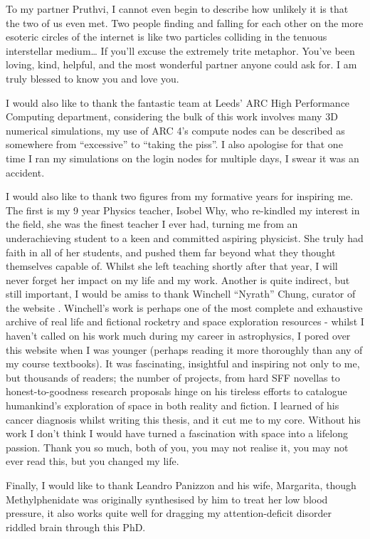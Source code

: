 \begin{acknowledgements}
To my partner Pruthvi, I cannot even begin to describe how unlikely it is that the two of us even met.
Two people finding and falling for each other on the more esoteric circles of the internet is like two particles colliding in the tenuous interstellar medium\ldots{}
If you'll excuse the extremely trite metaphor.
You've been loving, kind, helpful, and the most wonderful partner anyone could ask for.
I am truly blessed to know you and love you.

I would also like to thank the fantastic team at Leeds' ARC High Performance Computing department, considering the bulk of this work involves many 3D numerical simulations, my use of ARC 4's compute nodes can be described as somewhere from ``excessive'' to ``taking the piss''.
I also apologise for that one time I ran my simulations on the login nodes for multiple days, I swear it was an accident.

I would also like to thank two figures from my formative years for inspiring me.
The first is my 9 year Physics teacher, Isobel Why, who re-kindled my interest in the field, she was the finest teacher I ever had, turning me from an underachieving student to a keen and committed aspiring physicist.
She truly had faith in all of her students, and pushed them far beyond what they thought themselves capable of.
Whilst she left teaching shortly after that year, I will never forget her impact on my life and my work.
Another is quite indirect, but still important, I would be amiss to thank Winchell ``Nyrath'' Chung, curator of the website .
Winchell's work is perhaps one of the most complete and exhaustive archive of real life and fictional rocketry and space exploration resources - whilst I haven't called on his work much during my career in astrophysics, I pored over this website when I was younger (perhaps reading it more thoroughly than any of my course textbooks).
It was fascinating, insightful and inspiring not only to me, but thousands of readers; the number of projects, from hard SFF novellas to honest-to-goodness research proposals hinge on his tireless efforts to catalogue humankind's exploration of space in both reality and fiction.
I learned of his cancer diagnosis whilst writing this thesis, and it cut me to my core.
Without his work I don't think I would have turned a fascination with space into a lifelong passion.
Thank you so much, both of you, you may not realise it, you may not ever read this, but you changed my life.

Finally, I would like to thank Leandro Panizzon and his wife, Margarita, though Methylphenidate was originally synthesised by him to treat her low blood pressure, it also works quite well for dragging my attention-deficit disorder riddled brain through this PhD.

\end{acknowledgements}


